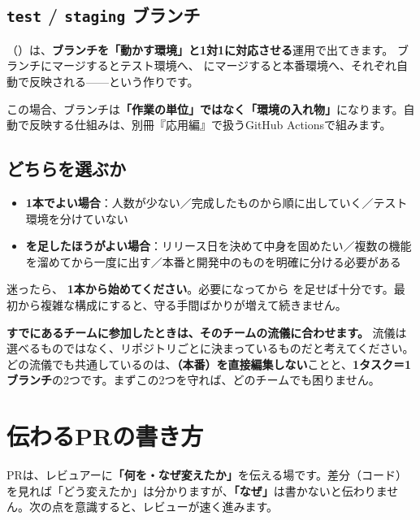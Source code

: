 \medskip

\subsection{\texttt{test} / \texttt{staging} ブランチ}

（）は、\textbf{ブランチを「動かす環境」と1対1に対応させる}運用で出てきます。 ブランチにマージするとテスト環境へ、 にマージすると本番環境へ、それぞれ自動で反映される——という作りです。

この場合、ブランチは\textbf{「作業の単位」ではなく「環境の入れ物」}になります。自動で反映する仕組みは、別冊『応用編』で扱うGitHub Actionsで組みます。

\subsection{どちらを選ぶか}

\begin{itemize}[leftmargin=1.4em]
  \item \textbf{ 1本でよい場合}：人数が少ない／完成したものから順に出していく／テスト環境を分けていない
  \item \textbf{ を足したほうがよい場合}：リリース日を決めて中身を固めたい／複数の機能を溜めてから一度に出す／本番と開発中のものを明確に分ける必要がある
\end{itemize}

迷ったら、\textbf{ 1本から始めてください}。必要になってから  を足せば十分です。最初から複雑な構成にすると、守る手間ばかりが増えて続きません。

\begin{warnbox}
\textbf{すでにあるチームに参加したときは、そのチームの流儀に合わせます。} 流儀は選べるものではなく、リポジトリごとに決まっているものだと考えてください。どの流儀でも共通しているのは、\textbf{（本番）を直接編集しない}ことと、\textbf{1タスク＝1ブランチ}の2つです。まずこの2つを守れば、どのチームでも困りません。
\end{warnbox}

\section{伝わるPRの書き方}

PRは、レビュアーに\textbf{「何を・なぜ変えたか」}を伝える場です。差分（コード）を見れば「どう変えたか」は分かりますが、\textbf{「なぜ」}は書かないと伝わりません。次の点を意識すると、レビューが速く進みます。


